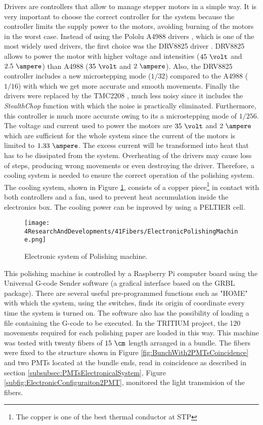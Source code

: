 \begin{enumerate}
Drivers are controllers that allow to manage stepper motors in a simple way. It is very important to choose the correct controller for the system because the controller limits the supply power to the motors, avoiding burning of the motors in the worst case. Instead of using the Pololu A4988 drivers \cite{A4988Driver}, which is one of the most widely used drivers, the first choice was the DRV8825 driver \cite{DRV8825Driver}. DRV8825 allows to power the motor with higher voltage and intensities ($45~\volt$ and $2.5~\ampere$) than A4988 ($35~\volt$ and $2~\ampere$). Also, the DRV8825 controller includes a new microstepping mode ($1/32$) compared to the A4988 ($1/16$) with which we get more accurate and smooth movements. Finally the drivers were replaced by the TMC2208 \cite{TMC2208Driver}, much less noisy since it includes the \textit{StealthChop} function with which the noise is practically eliminated. Furthermore, this controller is much more accurate owing to its a microstepping mode of $1/256$. The voltage and current used to power the motors are $35~\volt$ and $2~\ampere$ which are sufficient for the whole system since the current of the motors is limited to $1.33~\ampere$. The excess current will be transformed into heat that has to be dissipated from the system. Overheating of the drivers may cause loss of steps, producing wrong movements or even destroying the driver. Therefore, a cooling system is needed to ensure the correct operation of the polishing system. The cooling system, shown in Figure \ref{fig:ElectronicSystemPolishingMachine}, consists of a copper piece\footnote{The copper is one of the best thermal conductor at STP} in contact with both controllers and a fan, used to prevent heat accumulation inside the electronics box. The cooling power can be inproved by using a PELTIER cell.

\begin{figure}[h]
\centering
\texttt{[image: 4ResearchAndDevelopments/41Fibers/ElectronicPolishingMachine.png]}
\caption{Electronic system of Polishing machine.\label{fig:ElectronicSystemPolishingMachine}}
\end{figure}

\end{enumerate}

This polishing machine is controlled by a Raspberry Pi computer board using the Universal G-code Sender software (a grafical interface based on the GRBL package). There are several useful pre-programmed functions such as "HOME" with which the system, using the switches, finds its origin of coordinate every time the system is turned on. The software also has the possibility of loading a file containing the G-code to be executed. In the TRITIUM project, the 120 movements required for each polishing paper are loaded in this way. This machine was tested with twenty fibers of $15~\cm$ length arranged in a bundle. The fibers were fixed to the structure shown in Figure \ref{fig:BunchWith2PMTsCoincidence} and two PMTs located at the bundle ends, read in coincidence as described in section \ref{subsubsec:PMTsElectronicalSystem}, Figure \ref{subfig:ElectronicConfiguraiton2PMT}, monitored the light transmision of the fibers.

